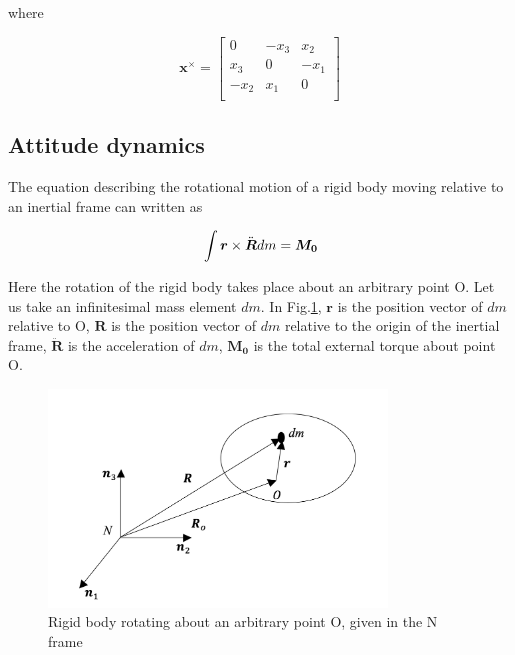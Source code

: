 where

\begin{equation}
\bm{x} ^ \times= \begin{bmatrix} 
0 & -x_3 & x_2 \\
x_3 & 0 & -x_1 \\
-x_2 & x_1 & 0 \\
 \end{bmatrix}
\end{equation}

\subsection{Attitude dynamics}

The equation describing the rotational motion of a rigid body moving relative to an inertial frame can written as \cite{wie2008space}

\begin{equation}{\label{eqn:kinematicEquDQM}}
\int \bm{r} \times \ddot{\bm{R}} dm = \bm{M_0}
\end{equation}

Here the rotation of the rigid body takes place about an arbitrary point O. 
Let us take an infinitesimal mass element $dm$. 
In Fig.\ref{fig:attDyn1}, $\bm{r}$ is the position vector of $dm$ relative to O, $\bm{R}$ is the position vector of $dm$ relative to the origin of the inertial frame, $\ddot{\bm{R}}$ is the acceleration of $dm$, $\bm{M_0}$ is the total external torque about point O.

\begin{figure}
\begin{center}
\includegraphics[width=9cm]{figures/attDyn1}    %
\caption{Rigid body rotating about an arbitrary point O, given in the N frame} 
\label{fig:attDyn1}
\end{center}
\end{figure}

